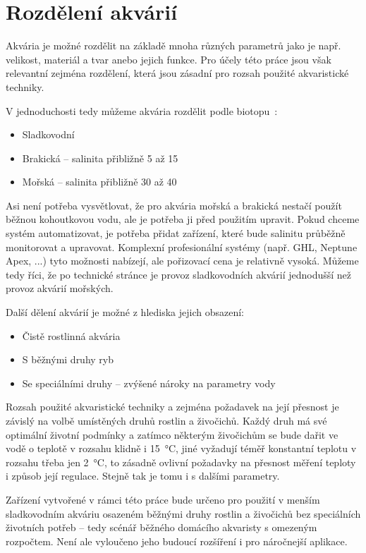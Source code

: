\section{Rozdělení akvárií}
Akvária je možné rozdělit na základě mnoha různých parametrů jako je např. velikost, materiál a tvar anebo jejich funkce. Pro účely této práce jsou však relevantní zejména rozdělení, která jsou zásadní pro rozsah použité akvaristické techniky. 

V jednoduchosti tedy můžeme akvária rozdělit podle biotopu~\cite{haskova_bakalarska2011}:
\begin{itemize}
    \item Sladkovodní
    \item Brakická -- salinita přibližně 5 až \qty{15}{\permille}
    \item Mořská -- salinita přibližně 30 až \qty{40}{\permille}
\end{itemize}

Asi není potřeba vysvětlovat, že pro akvária mořská a brakická nestačí použít běžnou kohoutkovou vodu, ale je potřeba ji před použitím upravit. Pokud chceme systém automatizovat, je potřeba přidat zařízení, které bude salinitu průběžně monitorovat a upravovat. Komplexní profesionální systémy (např. GHL, Neptune Apex, ...) tyto možnosti nabízejí, ale pořizovací cena je relativně vysoká. Můžeme tedy říci, že po technické stránce je provoz sladkovodních akvárií jednodušší než provoz akvárií mořských. 

Další dělení akvárií je možné z hlediska jejich obsazení:
\begin{itemize}
    \item Čistě rostlinná akvária
    \item S běžnými druhy ryb
    \item Se speciálními druhy -- zvýšené nároky na parametry vody
\end{itemize}
Rozsah použité akvaristické techniky a zejména požadavek na její přesnost je závislý na volbě umístěných druhů rostlin a živočichů. Každý druh má své optimální životní podmínky a zatímco některým živočichům se bude dařit ve vodě o teplotě v rozsahu klidně i \qty{15}{\degreeCelsius}, jiné vyžadují téměř konstantní teplotu v rozsahu třeba jen \qty{2}{\degreeCelsius}, to zásadně ovlivní požadavky na přesnost měření teploty i způsob její regulace. Stejně tak je tomu i s dalšími parametry.

Zařízení vytvořené v rámci této práce bude určeno pro použití v menším sladkovodním akváriu osazeném běžnými druhy rostlin a živočichů bez speciálních životních potřeb -- tedy scénář běžného domácího akvaristy s omezeným rozpočtem. Není ale vyloučeno jeho budoucí rozšíření i pro náročnejší aplikace.